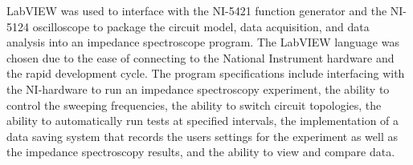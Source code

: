 \par LabVIEW was used to interface with the NI-5421 function generator and the NI-5124 oscilloscope to package the circuit model, data acquisition, and data analysis into an impedance spectroscope program. The LabVIEW language was chosen due to the ease of connecting to the National Instrument hardware and the rapid development cycle. The program specifications include interfacing with the NI-hardware to run an impedance spectroscopy experiment, the ability to control the sweeping frequencies, the ability to switch circuit topologies, the ability to automatically run tests at specified intervals, the implementation of a data saving system that records the users settings for the experiment as well as the impedance spectroscopy results, and the ability to view and compare data.

